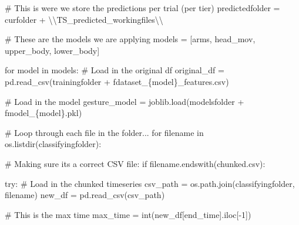 \documentclass[
  letterpaper,
  DIV=11,
  numbers=noendperiod]{scrreprt}
\newenvironment{Shaded}{\begin{snugshade}}{\end{snugshade}}
\newcommand{\BuiltInTok}[1]{\textcolor[rgb]{0.00,0.23,0.31}{#1}}
\newcommand{\CharTok}[1]{\textcolor[rgb]{0.13,0.47,0.30}{#1}}
\newcommand{\CommentTok}[1]{\textcolor[rgb]{0.37,0.37,0.37}{#1}}
\newcommand{\ControlFlowTok}[1]{\textcolor[rgb]{0.00,0.23,0.31}{#1}}
\newcommand{\DecValTok}[1]{\textcolor[rgb]{0.68,0.00,0.00}{#1}}
\newcommand{\KeywordTok}[1]{\textcolor[rgb]{0.00,0.23,0.31}{#1}}
\newcommand{\NormalTok}[1]{\textcolor[rgb]{0.00,0.23,0.31}{#1}}
\newcommand{\OperatorTok}[1]{\textcolor[rgb]{0.37,0.37,0.37}{#1}}
\newcommand{\SpecialCharTok}[1]{\textcolor[rgb]{0.37,0.37,0.37}{#1}}
\newcommand{\SpecialStringTok}[1]{\textcolor[rgb]{0.13,0.47,0.30}{#1}}
\newcommand{\StringTok}[1]{\textcolor[rgb]{0.13,0.47,0.30}{#1}}
\begin{document}
\begin{Shaded}
\begin{Highlighting}[]
\CommentTok{\# This is were we store the predictions per trial (per tier)}
\NormalTok{predictedfolder }\OperatorTok{=}\NormalTok{ curfolder }\OperatorTok{+} \StringTok{\textquotesingle{}}\CharTok{\textbackslash{}\textbackslash{}}\StringTok{TS\_predicted\_workingfiles}\CharTok{\textbackslash{}\textbackslash{}}\StringTok{\textquotesingle{}}

\CommentTok{\# These are the models we are applying}
\NormalTok{models }\OperatorTok{=}\NormalTok{ [}\StringTok{\textquotesingle{}arms\textquotesingle{}}\NormalTok{, }\StringTok{\textquotesingle{}head\_mov\textquotesingle{}}\NormalTok{, }\StringTok{\textquotesingle{}upper\_body\textquotesingle{}}\NormalTok{, }\StringTok{\textquotesingle{}lower\_body\textquotesingle{}}\NormalTok{]}

\ControlFlowTok{for}\NormalTok{ model }\KeywordTok{in}\NormalTok{ models:}
    \CommentTok{\# Load in the original df}
\NormalTok{    original\_df }\OperatorTok{=}\NormalTok{ pd.read\_csv(trainingfolder }\OperatorTok{+} \SpecialStringTok{f\textquotesingle{}dataset\_}\SpecialCharTok{\{}\NormalTok{model}\SpecialCharTok{\}}\SpecialStringTok{\_features.csv\textquotesingle{}}\NormalTok{)}

    \CommentTok{\# Load in the model}
\NormalTok{    gesture\_model }\OperatorTok{=}\NormalTok{ joblib.load(modelsfolder }\OperatorTok{+} \SpecialStringTok{f\textquotesingle{}model\_}\SpecialCharTok{\{}\NormalTok{model}\SpecialCharTok{\}}\SpecialStringTok{.pkl\textquotesingle{}}\NormalTok{)}

    \CommentTok{\# Loop through each file in the folder...}
    \ControlFlowTok{for}\NormalTok{ filename }\KeywordTok{in}\NormalTok{ os.listdir(classifyingfolder):}
        
        \CommentTok{\# Making sure it\textquotesingle{}s a correct CSV file:}
        \ControlFlowTok{if}\NormalTok{ filename.endswith(}\StringTok{\textquotesingle{}chunked.csv\textquotesingle{}}\NormalTok{):}
            
            \ControlFlowTok{try}\NormalTok{:}
                \CommentTok{\# Load in the chunked timeseries}
\NormalTok{                csv\_path }\OperatorTok{=}\NormalTok{ os.path.join(classifyingfolder, filename)}
\NormalTok{                new\_df }\OperatorTok{=}\NormalTok{ pd.read\_csv(csv\_path)}
                
                \CommentTok{\# This is the max time}
\NormalTok{                max\_time }\OperatorTok{=} \BuiltInTok{int}\NormalTok{(new\_df[}\StringTok{\textquotesingle{}end\_time\textquotesingle{}}\NormalTok{].iloc[}\OperatorTok{{-}}\DecValTok{1}\NormalTok{])}


\end{Highlighting}
\end{Shaded}
\end{document}
